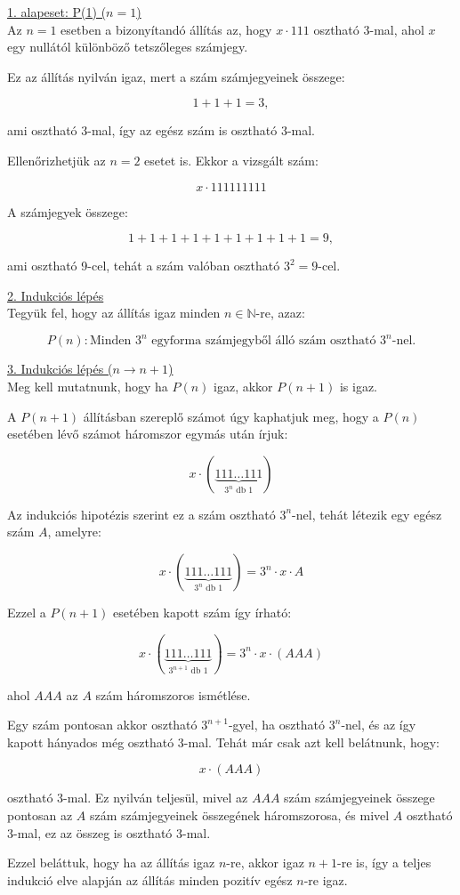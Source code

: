 \begin{solution}
\underline{1. alapeset: P(1) ($n=1$)}\\
 Az $n=1$ esetben a bizonyítandó állítás az,
hogy $x\cdot111$ osztható 3-mal, ahol $x$ egy nullától különböző
tetszőleges számjegy.

Ez az állítás nyilván igaz, mert a szám számjegyeinek összege:

\[
1+1+1=3,
\]

ami osztható 3-mal, így az egész szám is osztható 3-mal.

Ellenőrizhetjük az $n=2$ esetet is. Ekkor a vizsgált szám:

\[
x\cdot111111111
\]

A számjegyek összege:

\[
1+1+1+1+1+1+1+1+1=9,
\]

ami osztható 9-cel, tehát a szám valóban osztható $3^{2}=9$-cel.

\underline{2. Indukciós lépés}\\

Tegyük fel, hogy az állítás igaz minden $n\in\mathbb{N}$-re, azaz:

\[
P(n):\text{Minden }3^{n}\text{ egyforma számjegyből álló szám osztható }3^{n}\text{-nel.}
\]

\underline{3. Indukciós lépés ($n\to n+1$)}\\

Meg kell mutatnunk, hogy ha $P(n)$ igaz, akkor $P(n+1)$ is igaz.

A $P(n+1)$ állításban szereplő számot úgy kaphatjuk meg, hogy a $P(n)$
esetében lévő számot háromszor egymás után írjuk:

\[
x\cdot(\underbrace{111\ldots111}_{3^{n}\text{ db 1}})
\]

Az indukciós hipotézis szerint ez a szám osztható $3^{n}$-nel, tehát
létezik egy egész szám $A$, amelyre:

\[
x\cdot(\underbrace{111\ldots111}_{3^{n}\text{ db 1}})=3^{n}\cdot x\cdot A
\]

Ezzel a $P(n+1)$ esetében kapott szám így írható:

\[
x\cdot(\underbrace{111\ldots111}_{3^{n+1}\text{ db 1}})=3^{n}\cdot x\cdot(AAA)
\]

ahol $AAA$ az $A$ szám háromszoros ismétlése.

Egy szám pontosan akkor osztható $3^{n+1}$-gyel, ha osztható $3^{n}$-nel,
és az így kapott hányados még osztható 3-mal. Tehát már csak azt kell
belátnunk, hogy:

\[
x\cdot(AAA)
\]

osztható 3-mal. Ez nyilván teljesül, mivel az $AAA$ szám számjegyeinek
összege pontosan az $A$ szám számjegyeinek összegének háromszorosa,
és mivel $A$ osztható 3-mal, ez az összeg is osztható 3-mal.

Ezzel beláttuk, hogy ha az állítás igaz $n$-re, akkor igaz $n+1$-re
is, így a teljes indukció elve alapján az állítás minden pozitív egész
$n$-re igaz. 
\end{solution}

